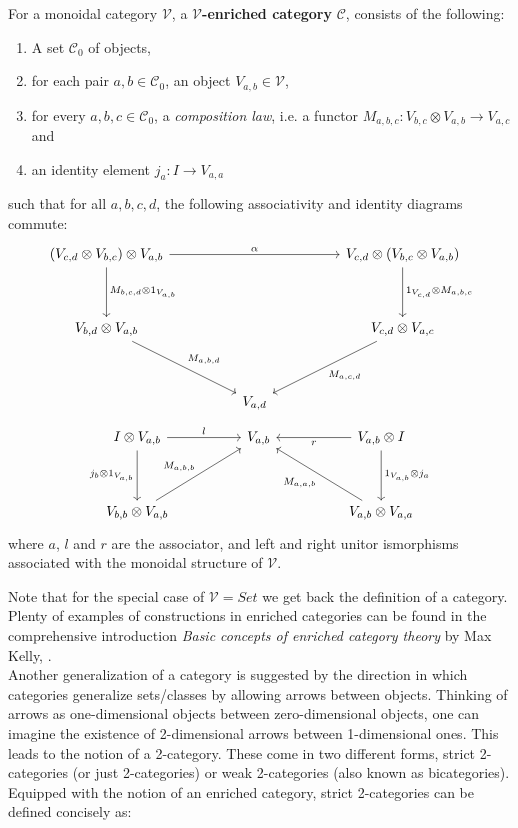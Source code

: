 \begin{defn}\label{enr-cat}
  For a monoidal category $\mathcal{V}$, a \textbf{$\mathcal{V}$-enriched category} $\mathcal{C}$, consists of the following:
  \begin{enumerate}
  \item A set $\mathcal{C}_0$ of objects,
  \item for each pair $a, b \in \mathcal{C}_0$, an object $V_{a,b} \in \mathcal{V}$,
  \item for every $a, b, c \in \mathcal{C}_0$, a \textit{composition law}, i.e. a functor $M_{a, b, c} : V_{b, c} \otimes V_{a, b} \to V_{a, c}$ and
  \item an identity element $j_a : I \to V_{a, a}$
\end{enumerate}
such that for all $a, b, c, d$, the following associativity and identity diagrams commute:
    \[
      \ti
      (V_{c, d} \otimes V_{b, c}) \otimes V_{a, b} \ar[d, "{M_{b, c, d} \otimes 1_{V_{a,b}}}"] \ar[rr, "\alpha"] & & V_{c, d} \otimes (V_{b, c} \otimes V_{a, b}) \ar[d, "{1_{V_{c,d}} \otimes M_{a, b, c}}"]\\
      V_{b, d} \otimes V_{a, b} \ar[rd, "M_{a, b, d}"] & & V_{c, d} \otimes V_{a, c} \ar[ld, "M_{a, c, d}"]\\
      & V_{a, d}      &
      \kz
    \]
    \[
      \ti
      I \otimes V_{a, b} \ar[d, "j_b \otimes 1_{V_{a, b}}", swap] \ar[r, "l"] & V_{a, b} & V_{a, b} \otimes I \ar[l, "r"] \ar[d, "1_{V_{a, b}} \otimes j_a"] \\
      V_{b, b} \otimes V_{a, b} \ar[ru, "M_{a, b, b}"] & & V_{a, b} \otimes V_{a, a} \ar[lu, "M_{a, a, b}"]
      \kz
    \]
    where $a$, $l$ and $r$ are the associator, and left and right unitor ismorphisms associated with the monoidal structure of $\mathcal{V}$.
\end{defn}
Note that for the special case of $\mathcal{V} = Set$ we get back the definition of a category. Plenty of examples of constructions in enriched categories can be found in the comprehensive introduction \textit{Basic concepts of enriched category theory} by Max Kelly, \cite{kelly}.\\
Another generalization of a category is suggested by the direction in which categories generalize sets/classes by allowing arrows between objects. Thinking of arrows as one-dimensional objects between zero-dimensional objects, one can imagine the existence of 2-dimensional arrows between 1-dimensional ones. This leads to the notion of a 2-category. These come in two different forms, strict 2-categories (or just 2-categories) or weak 2-categories (also known as bicategories). Equipped with the notion of an enriched category, strict 2-categories can be defined concisely as:
